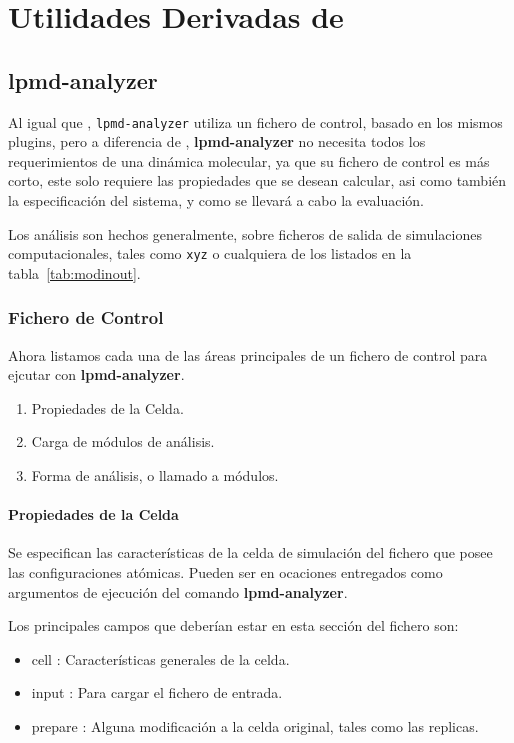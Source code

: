 \chapter{Utilidades Derivadas de \lpmd}
\label{chap:utilidades}
\section{lpmd-analyzer}

Al igual que {\lpmd}, \verb|lpmd-analyzer| utiliza un fichero de control, basado en los mismos plugins, pero a diferencia de {\lpmd}, \textbf{lpmd-analyzer} no necesita todos los requerimientos de una din\'amica molecular, ya que su fichero de control es m\'as corto, este solo requiere las propiedades que se desean calcular, asi como tambi\'en la especificaci\'on del sistema, y como se llevar\'a a cabo la evaluaci\'on.

Los an\'alisis son hechos generalmente, sobre ficheros de salida de simulaciones computacionales, tales como \verb|xyz| o cualquiera de los listados en la tabla~\ref{tab:modinout}.

\subsection{Fichero de Control}
Ahora listamos cada una de las \'areas principales de un fichero de control para ejcutar con \textbf{lpmd-analyzer}.

\begin{enumerate}
 \item Propiedades de la Celda.
 \item Carga de m\'odulos de an\'alisis.
 \item Forma de an\'alisis, o llamado a m\'odulos.
\end{enumerate}

\subsubsection{Propiedades de la Celda}
Se especifican las caracter\'isticas de la celda de simulaci\'on del fichero que posee las configuraciones at\'omicas. Pueden ser en ocaciones entregados como argumentos de ejecuci\'on del comando \textbf{lpmd-analyzer}.

Los principales campos que deber\'ian estar en esta secci\'on del fichero son:
\begin{itemize}
 \item cell : Caracter\'isticas generales de la celda.
 \item input : Para cargar el fichero de entrada.
 \item prepare : Alguna modificaci\'on a la celda original, tales como las replicas.
\end{itemize}
